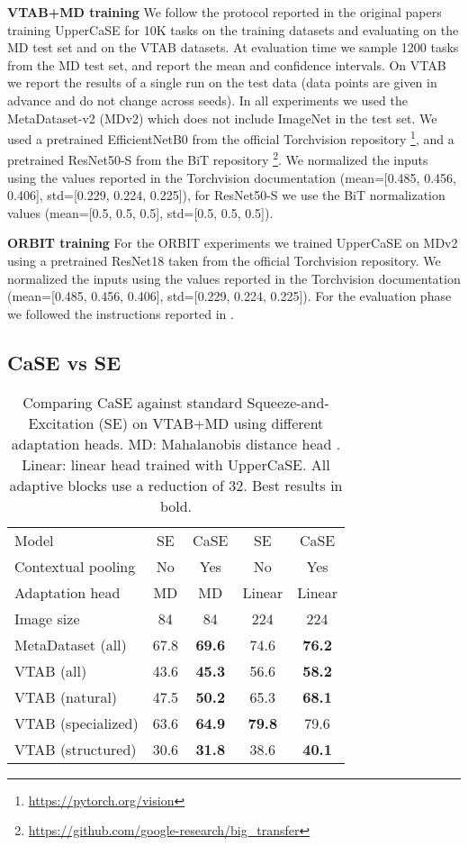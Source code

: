 \documentclass{article}
\begin{document}
\textbf{VTAB+MD training} We follow the protocol reported in the original papers \citep{triantafillou2019meta, dumoulin2021comparing} training UpperCaSE for 10K tasks on the training datasets and evaluating on the MD test set and on the VTAB datasets. At evaluation time we sample 1200 tasks from the MD test set, and report the mean and confidence intervals. On VTAB we report the results of a single run on the test data (data points are given in advance and do not change across seeds).
In all experiments we used the MetaDataset-v2 (MDv2) which does not include ImageNet in the test set. We used a pretrained EfficientNetB0 from the official Torchvision repository \footnote{\url{https://pytorch.org/vision}}, and a pretrained ResNet50-S from the BiT repository \footnote{\url{https://github.com/google-research/big_transfer}}. We normalized the inputs using the values reported in the Torchvision documentation (mean=[0.485, 0.456, 0.406], std=[0.229, 0.224, 0.225]), for ResNet50-S we use the BiT normalization values (mean=[0.5, 0.5, 0.5], std=[0.5, 0.5, 0.5]).

\textbf{ORBIT training} For the ORBIT experiments we trained UpperCaSE on MDv2 using a pretrained ResNet18 taken from the official Torchvision repository. We normalized the inputs using the values reported in the Torchvision documentation (mean=[0.485, 0.456, 0.406], std=[0.229, 0.224, 0.225]).
For the evaluation phase we followed the instructions reported in \cite{massiceti2021orbit}. 

\subsection{CaSE vs SE} \label{appendix:ssec_case_vs_se}

\begin{table}[H]
\caption{Comparing CaSE against standard Squeeze-and-Excitation (SE) on VTAB+MD using different adaptation heads. MD: Mahalanobis distance head \citep{bronskill2021memory}. Linear: linear head trained with UpperCaSE.  All adaptive blocks use a reduction of 32. Best results in bold.}
\vskip 0.15in
\begin{center}
\begin{tabular}{lcc|cc}
\toprule
Model & SE & CaSE & SE & CaSE \\
Contextual pooling & No & Yes & No & Yes \\
Adaptation head & MD & MD & Linear & Linear \\
Image size & 84 & 84 & 224 & 224\\
\midrule
MetaDataset (all) & 67.8 & \textbf{69.6} & 74.6 & \textbf{76.2} \\
VTAB (all) & 43.6 & \textbf{45.3} & 56.6 & \textbf{58.2} \\
VTAB (natural) & 47.5 & \textbf{50.2} & 65.3 & \textbf{68.1} \\
VTAB (specialized) & 63.6 & \textbf{64.9} & \textbf{79.8} & 79.6 \\
VTAB (structured) & 30.6 & \textbf{31.8} & 38.6 & \textbf{40.1} \\
\bottomrule
\end{tabular}
\label{tab:se_vs_case}
\end{center}
\vskip -0.1in
\end{table}
\end{document}
